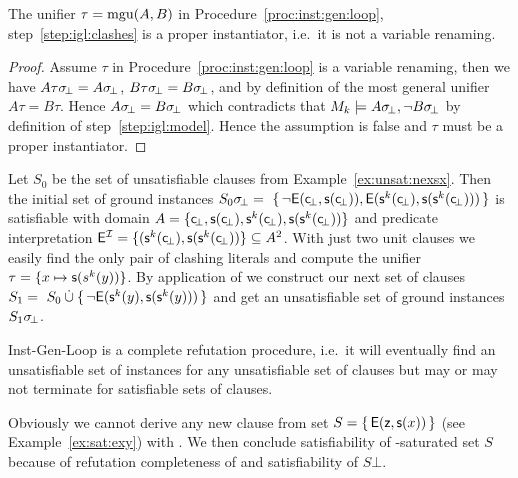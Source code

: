 \begin{lemma}
	The unifier \( \tau = \operatorname{mgu}(A,B) \) in Procedure~\ref{proc:inst:gen:loop},
	step~\ref{step:igl:clashes} is a proper instantiator,
	i.e.~it is not a variable renaming.
\end{lemma}
\begin{proof}
	Assume \( \tau \) in Procedure~\ref{proc:inst:gen:loop}
	is a variable renaming, then we have
	\( A\tau\sigma \!_\bot = A\sigma \!_\bot \),
	\( B\tau\sigma \!_\bot = B\sigma \!_\bot \),
	and by definition of the most general unifier \( A\tau = B\tau \).
	Hence \( A\sigma \!_\bot = B\sigma \!_\bot \) which contradicts that
	\( M_k\models A\sigma \!_\bot, \lnot B\sigma \!_\bot \)
	by definition of step~\ref{step:igl:model}.
	Hence the assumption is false and \( \tau \) must be a proper instantiator.
\end{proof}





\begin{example}\label{ex:unsat2}
Let \( S_0 \) be the set of unsatisfiable clauses
from Example~\ref{ex:unsat:nexsx}.
Then the initial set of ground instances
\( S_0\sigma \!_\bot =\
 \{ \,
{ \lnot\mathsf{E}(\mathsf{c} \!_\bot, \mathsf{s}(\mathsf{c} \!_\bot)) },
{ \mathsf{E}(\mathsf{s}^k(\mathsf{c} \!_\bot), \mathsf{s}(\mathsf{s}^k(\mathsf{c} \!_\bot)))}
 \, \} \)
is satisfiable with domain
\( A = \{ \mathsf{c} \!_\bot, \mathsf{s}(\mathsf{c} \!_\bot), \mathsf{s}^k(\mathsf{c} \!_\bot), \mathsf{s}(\mathsf{s}^k(\mathsf{c} \!_\bot)) \} \)
and predicate interpretation
\( \mathsf{E}^{\mathcal{I}} = \{ (\mathsf{s}^k(\mathsf{c} \!_\bot), \mathsf{s}(\mathsf{s}^k(\mathsf{c} \!_\bot)) \} \subseteq A^2 \).
%
 With just two unit clauses we easily find the only pair of clashing literals and compute the unifier
 \( \tau = \{ x\mapsto \mathsf{s}(s^k(y)) \} \).
 By application of \InstGen{} we construct our next set of clauses
\( S_1 =\
S_0 \mathbin{\dot\cup}
 \{ \,
 { \lnot\mathsf{E}(\mathsf{s}^k(y), \mathsf{s}(\mathsf{s}^k(y)))}
 \, \}
 \)
 and get an unsatisfiable set of ground instances \( S_1\sigma \!_\bot \).
\end{example}


\begin{lemma}
	Inst-Gen-Loop is a complete refutation procedure, 
	i.e.\ it will eventually find an unsatisfiable set of instances
	for any unsatisfiable set of clauses 
	but may or may not terminate for
	satisfiable sets of clauses.
\end{lemma}

\begin{example}
	Obviously we cannot derive any new clause from set
	\( S = \{ \, \mathsf{E}(\mathsf{z},\mathsf{s}(x)) \, \} \)
	(see Example~\ref{ex:sat:exy}) with \InstGen.
	We then conclude satisfiability
	of \InstGen-saturated set \( S \)
	because of refutation completeness of \InstGen 
	and satisfiability of \( S\bot \).
\end{example}


